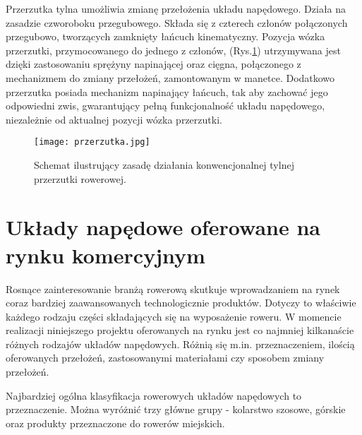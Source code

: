 Przerzutka tylna umożliwia zmianę przełożenia układu napędowego. Działa na zasadzie czworoboku przegubowego. Składa się z czterech członów połączonych przegubowo, tworzących zamknięty łańcuch kinematyczny. Pozycja wózka przerzutki, przymocowanego do jednego z członów, (Rys.\ref{fig:przerzutka}) utrzymywana jest dzięki zastosowaniu sprężyny napinającej oraz cięgna, połączonego z mechanizmem do zmiany przełożeń, zamontowanym w manetce. Dodatkowo przerzutka posiada mechanizm napinający łańcuch, tak aby zachować jego odpowiedni zwis, gwarantujący pełną funkcjonalność układu napędowego, niezależnie od aktualnej pozycji wózka przerzutki. 
\begin{figure}[h]
    \centering
    \texttt{[image: przerzutka.jpg]}
    \caption{Schemat ilustrujący zasadę działania konwencjonalnej tylnej przerzutki rowerowej.}
    \label{fig:przerzutka}
\end{figure}

\section{Układy napędowe oferowane na rynku komercyjnym}

Rosnące zainteresowanie branżą rowerową skutkuje wprowadzaniem na rynek coraz bardziej zaawansowanych technologicznie produktów. Dotyczy to właściwie każdego rodzaju części składających się na wyposażenie roweru. W momencie realizacji niniejszego projektu oferowanych na rynku jest co najmniej kilkanaście różnych rodzajów układów napędowych. Różnią się m.in. przeznaczeniem, ilością oferowanych przełożeń, zastosowanymi materiałami czy sposobem zmiany przełożeń.

Najbardziej ogólna klasyfikacja rowerowych układów napędowych to przeznaczenie. Można wyróżnić trzy główne grupy - kolarstwo szosowe, górskie oraz produkty przeznaczone do rowerów miejskich.

